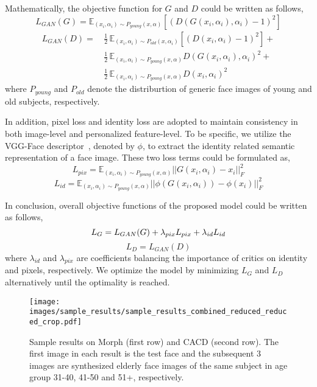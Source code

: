 \documentclass[10pt,twocolumn,letterpaper]{article}
\begin{document}
Mathematically, the objective function for $G$ and $D$ could be written as follows,
\begin{equation}
L_{GAN}(G)=\mathbb{E}_{(x_i, \alpha_i)\sim P_{young}(x, \alpha)}[(D(G(x_i, \alpha_i), \alpha_i)-1)^2]
\end{equation}
\begin{equation}
\begin{split}
L_{GAN}(D)=&\,\frac{1}{2}\,\mathbb{E}_{(x_i, \alpha_i)\sim P_{old}(x, \alpha_i)}[(D(x_i, \alpha_i)-1)^2]+\\
      &\,\frac{1}{2}\,\mathbb{E}_{(x_i, \alpha_i)\sim P_{young}(x, \alpha)}D(G(x_i, \alpha_i), \alpha_i)^2+\\
      &\,\frac{1}{2}\,\mathbb{E}_{(x_i, \alpha_i)\sim P_{young}(x, \alpha)}D(x_i, \alpha_i)^2
\end{split}
\end{equation}
where $P_{young}$ and $P_{old}$ denote the distriburtion of generic face images of young and old subjects, respectively. 

In addition, pixel loss and identity loss are adopted to maintain consistency in both image-level and personalized feature-level. 
To be specific, we utilize the VGG-Face descriptor~\cite{parkhi2015deep}, denoted by $\phi$, to extract the identity related semantic representation of a face image. These two loss terms could be formulated as,
\begin{equation}
L_{pix}=\mathbb{E}_{(x_i, \alpha_i)\sim P_{young}(x, \alpha)}||G(x_i, \alpha_i)-x_i||_F^2
\end{equation}
\begin{equation}
L_{id}=\mathbb{E}_{(x_i, \alpha_i)\sim P_{young}(x, \alpha)}||\phi(G(x_i, \alpha_i))-\phi(x_i)||_F^2
\end{equation}

In conclusion, overall objective functions of the proposed model could be written as follows,
\begin{equation}
L_G=L_{GAN}(G)+\lambda_{pix}L_{pix}+\lambda_{id}L_{id} \\
\end{equation}
\begin{equation}
L_D=L_{GAN}(D)
\end{equation}
where $\lambda_{id}$ and $\lambda_{pix}$ are coefficients balancing the importance of critics on identity and pixels, respectively. We optimize the model by minimizing $L_G$ and $L_D$ alternatively  until the optimality is reached.

\begin{figure*}[ht]
\centering\texttt{[image: images/sample\_results/sample\_results\_combined\_reduced\_reduced\_crop.pdf]}
\caption{Sample results on Morph (first row) and CACD (second row). The first image in each result is the test face and the subsequent 3 images are synthesized elderly face images of the same subject in age group 31-40, 41-50 and 51+, respectively.}
\label{fig:sampleResults}
\end{figure*}
\end{document}
